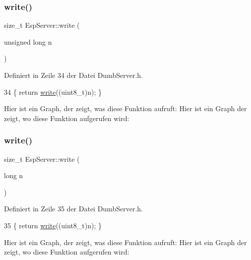 \subsubsection{\texorpdfstring{write()}{write()}\hspace{0.1cm}{\footnotesize\ttfamily [3/6]}}
{\footnotesize\ttfamily size\+\_\+t Esp\+Server\+::write (\begin{DoxyParamCaption}\item[{unsigned long}]{n }\end{DoxyParamCaption})\hspace{0.3cm}{\ttfamily [inline]}}



Definiert in Zeile 34 der Datei Dumb\+Server.\+h.


\begin{DoxyCode}
34 \{ \textcolor{keywordflow}{return} \hyperlink{class_esp_server_a0756c42343195dd1d1aa2f61c9b095bf}{write}((uint8\_t)n); \}
\end{DoxyCode}
Hier ist ein Graph, der zeigt, was diese Funktion aufruft\+:
Hier ist ein Graph der zeigt, wo diese Funktion aufgerufen wird\+:
\mbox{\label{class_esp_server_ac256a11ccc8d32664729a7f5bfc71add}} 
\subsubsection{\texorpdfstring{write()}{write()}\hspace{0.1cm}{\footnotesize\ttfamily [4/6]}}
{\footnotesize\ttfamily size\+\_\+t Esp\+Server\+::write (\begin{DoxyParamCaption}\item[{long}]{n }\end{DoxyParamCaption})\hspace{0.3cm}{\ttfamily [inline]}}



Definiert in Zeile 35 der Datei Dumb\+Server.\+h.


\begin{DoxyCode}
35 \{ \textcolor{keywordflow}{return} \hyperlink{class_esp_server_a0756c42343195dd1d1aa2f61c9b095bf}{write}((uint8\_t)n); \}
\end{DoxyCode}
Hier ist ein Graph, der zeigt, was diese Funktion aufruft\+:
Hier ist ein Graph der zeigt, wo diese Funktion aufgerufen wird\+:
\mbox{\label{class_esp_server_afde7c57b12659422147d9a5e56b76148}} 
